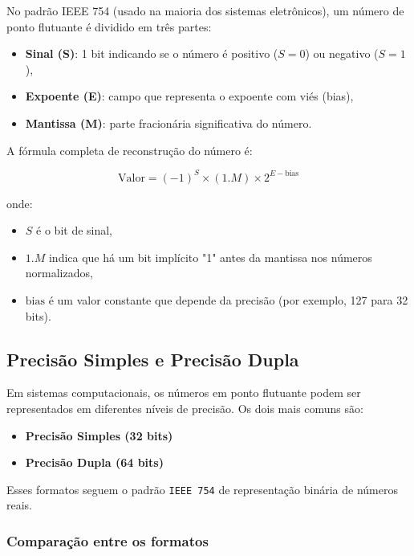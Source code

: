 No padrão IEEE 754 (usado na maioria dos sistemas eletrônicos), um número de ponto flutuante é dividido em três partes:

\begin{itemize}
  \item \textbf{Sinal (S)}: 1 bit indicando se o número é positivo (\( S = 0 \)) ou negativo (\( S = 1 \)),
  \item \textbf{Expoente (E)}: campo que representa o expoente com viés (bias),
  \item \textbf{Mantissa (M)}: parte fracionária significativa do número.
\end{itemize}

A fórmula completa de reconstrução do número é:

\[
\text{Valor} = (-1)^S \times (1.M) \times 2^{E - \text{bias}}
\]

onde:

\begin{itemize}
  \item \( S \) é o bit de sinal,
  \item \( 1.M \) indica que há um bit implícito "1" antes da mantissa nos números normalizados,
  \item \( \text{bias} \) é um valor constante que depende da precisão (por exemplo, 127 para 32 bits).
\end{itemize}

\subsection{Precisão Simples e Precisão Dupla}

Em sistemas computacionais, os números em ponto flutuante podem ser representados em diferentes níveis de precisão. Os dois mais comuns são:

\begin{itemize}
  \item \textbf{Precisão Simples (32 bits)}
  \item \textbf{Precisão Dupla (64 bits)}
\end{itemize}

Esses formatos seguem o padrão \texttt{IEEE 754} de representação binária de números reais.

\subsubsection*{Comparação entre os formatos}


